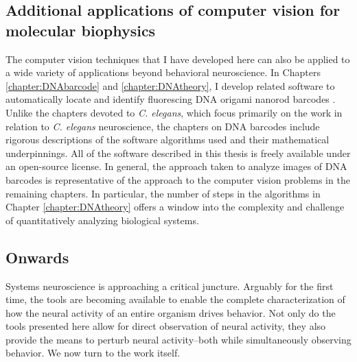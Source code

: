 \subsection{Additional applications of computer vision for molecular biophysics}
The computer vision techniques that I have developed here can also be applied to a wide variety of applications beyond behavioral neuroscience. In Chapters \ref{chapter:DNAbarcode} and \ref{chapter:DNAtheory}, I develop related software to automatically locate and identify fluorescing DNA origami nanorod barcodes . Unlike the chapters devoted to \textit{C. elegans}, which focus primarily on the work in relation to \textit{C. elegans} neuroscience, the chapters on DNA barcodes include rigorous descriptions of the software algorithms used and  their mathematical underpinnings. All of the software described in this thesis is freely available under an open-source license.   In general, the approach taken to analyze images of DNA barcodes is representative of the approach to the computer vision problems in the remaining chapters. In particular, the number of steps in the algorithms in Chapter \ref{chapter:DNAtheory} offers a window into the complexity and challenge of quantitatively analyzing biological systems. 





\subsection{Onwards}
Systems neuroscience is approaching  a critical juncture. Arguably for the first time, the tools are becoming available to enable the  complete characterization of how the neural activity of an entire organism drives  behavior. Not only  do the tools presented here allow for direct observation of neural activity,  they also provide the means to perturb neural activity--both while simultaneously observing behavior. We now turn to the work itself.


